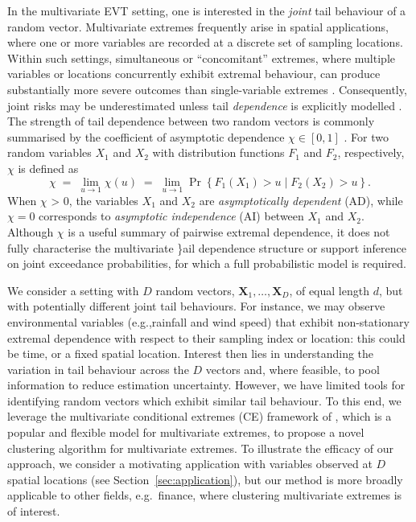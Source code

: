 \documentclass[preprint,12pt,authoryear]{elsarticle}
\begin{document}
In the multivariate EVT setting, one is interested in the \emph{joint} tail behaviour of a random vector.
Multivariate extremes frequently arise in spatial applications, where one or more variables are recorded at a discrete set of sampling locations.
Within such settings, simultaneous or ``concomitant'' extremes, where multiple variables or locations concurrently exhibit extremal behaviour, can produce substantially more severe outcomes than single-variable extremes \citep{zscheischler2018future, bevacqua2021guidelines, Rohrbeck2021, Sando2022}.
Consequently, joint risks may be underestimated unless tail \emph{dependence} is explicitly modelled \citep{Zhang2024}. 
The strength of tail dependence between two random vectors is commonly summarised by the coefficient of asymptotic dependence \(\chi\in[0,1]\) \citep[see e.g.,][]{Coles1999}.
For two random variables $X_1$ and $X_2$ with distribution functions $F_1$ and $F_2$, respectively, $\chi$ is defined as
\begin{equation} \label{eq:chi}
  \chi \;=\; \lim_{u\to 1} \chi(u) \;=\; \lim_{u\to 1}\Pr\left\{F_1(X_1)>u \mid F_2(X_2)>u\right\}.
\end{equation}
When $\chi$ > 0, the variables $X_1$ and $X_2$ are \emph{asymptotically dependent} (AD), while $\chi=0$ corresponds to \emph{asymptotic independence} (AI) between $X_1$ and $X_2$.
Although \(\chi\) is a useful summary of pairwise extremal dependence, it does not fully characterise the multivariate \}ail dependence structure or support inference on joint exceedance probabilities, for which a full probabilistic model is required.

We consider a setting with $D$ random vectors, $\boldsymbol{X}_1, \ldots, \boldsymbol{X}_D$, of equal length $d$, but with potentially different joint tail behaviours. 
For instance, we may observe environmental variables (e.g.,\@ rainfall and wind speed) that exhibit non-stationary extremal dependence with respect to their sampling index or location: this could be time, or a fixed spatial location. 
Interest then lies in understanding the variation in tail behaviour across the $D$ vectors and, where feasible, to pool information to reduce estimation uncertainty. 
However, we have limited tools for identifying random vectors which exhibit similar tail behaviour.
To this end, we leverage the multivariate conditional extremes (CE) framework of \citet{Heffernan2004}, which is a popular and flexible model for multivariate extremes, to propose a novel clustering algorithm for multivariate extremes.
To illustrate the efficacy of our approach, we consider a motivating application with variables observed at $D$ spatial locations (see Section~\ref{sec:application}), but our method is more broadly applicable to other fields, e.g.\ finance, where clustering multivariate extremes is of interest. 
\end{document}
